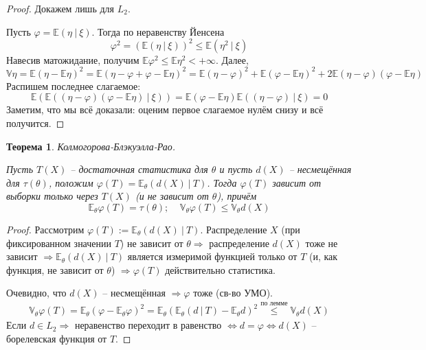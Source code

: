 \documentclass[a4paper,12pt]{article}
\renewcommand{\phi}{\ensuremath{\varphi}}
\renewcommand{\leq}{\ensuremath{\leqslant}}
\theoremstyle{plain}
\newtheorem{theorem}{Теорема}[section]
\theoremstyle{definition}
\theoremstyle{remark}
\begin{document}
\begin{proof}\label{KBR}
  Докажем лишь для $L_2$.

  Пусть $\phi = \mathbb{E}(\eta \:\vert\: \xi)$. Тогда по неравенству Йенсена
  \[
    \phi^2 = (\mathbb{E}(\eta\:\vert\:\xi))^2 \leq \mathbb{E}(\eta^2 \:\vert\: \xi)
  \]
  Навесив матожидание, получим $\mathbb{E}\phi^2 \leq \mathbb{E}\eta^2 < +\infty$. Далее,
  \[
    \mathbb{V}\eta = \mathbb{E}(\eta - \mathbb{E}\eta)^2 = \mathbb{E}(\eta - \phi + \phi - \mathbb{E}\eta)^2 = \mathbb{E}(\eta - \phi)^2 + \mathbb{E}(\phi - \mathbb{E}\eta)^2 + 2\mathbb{E}(\eta - \phi)(\phi - \mathbb{E}\eta)
  \]
  Распишем последнее слагаемое:
  \[
    \mathbb{E}(\mathbb{E}((\eta - \phi)(\phi - \mathbb{E}\eta) \:\vert\: \xi)) = \mathbb{E}(\phi - \mathbb{E}\eta)\mathbb{E}((\eta - \phi) \:\vert\: \xi) = 0
  \]
  Заметим, что мы всё доказали: оценим первое слагаемое нулём снизу и всё получится.
\end{proof}

\begin{theorem}
  Колмогорова-Блэкуэлла-Рао.

  Пусть $T(X)$ -- достаточная статистика для $\theta$ и пусть $d(X)$ -- несмещённая для $\tau(\theta)$, положим $\phi(T) = \mathbb{E}_\theta(d(X) \:\vert\: T)$. Тогда $\phi(T)$ зависит от выборки только через $T(X)$ (и не зависит от $\theta$), причём
  \[
    \mathbb{E}_\theta\phi(T) = \tau(\theta);\;\;\;\; \mathbb{V}_\theta\phi(T) \leq \mathbb{V}_\theta d(X)
  \]
\end{theorem}

\begin{proof}
  Рассмотрим $\phi(T) := \mathbb{E}_\theta(d(X) \:\vert\: T)$. Распределение $X$ (при фиксированном значении $T$) не зависит от $\theta \Rightarrow$ распределение $d(X)$ тоже не зависит $\Rightarrow \mathbb{E}_\theta(d(X) \:\vert\: T)$ является измеримой функцией только от $T$ (и, как функция, не зависит от $\theta$) $\Rightarrow \phi(T)$ действительно статистика.

  Очевидно, что $d(X)$ -- несмещённая $\Rightarrow \phi$ тоже (св-во УМО).
  \begin{align*}
    \mathbb{V}_\theta\phi(T) = \mathbb{E}_\theta(\phi - \mathbb{E}_\theta\phi)^2 = \mathbb{E}_\theta(\mathbb{E}_\theta(d\:\vert\:T) - \mathbb{E}_\theta d)^2 \overset{\text{по лемме}}{\leq} \mathbb{V}_\theta d(X)
  \end{align*}
  Если $d \in L_2 \Rightarrow$ неравенство переходит в равенство $\Leftrightarrow d = \phi\Leftrightarrow d(X)$ -- борелевская функция от $T$.
\end{proof}
\end{document}
